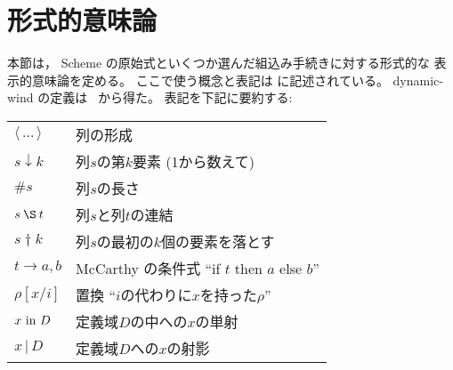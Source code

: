 \section{形式的意味論}
\label{formalsemanticssection}

\bgroup

\newcommand{\sembrack}[1]{[\![#1]\!]}
\newcommand{\fun}[1]{\hbox{\it #1}}
\newenvironment{semfun}{\begin{tabbing}$}{$\end{tabbing}}
\newcommand\LOC{{\tt{}L}}
\newcommand\NAT{{\tt{}N}}
\newcommand\TRU{{\tt{}T}}
\newcommand\SYM{{\tt{}Q}}
\newcommand\CHR{{\tt{}H}}
\newcommand\NUM{{\tt{}R}}
\newcommand\FUN{{\tt{}F}}
\newcommand\EXP{{\tt{}E}}
\newcommand\STV{{\tt{}E}}
\newcommand\STO{{\tt{}S}}
\newcommand\ENV{{\tt{}U}}
\newcommand\ANS{{\tt{}A}}
\newcommand\ERR{{\tt{}X}}
\newcommand\DP{\tt{P}}
\newcommand\EC{{\tt{}K}}
\newcommand\CC{{\tt{}C}}
\newcommand\MSC{{\tt{}M}}
\newcommand\PAI{\hbox{\EXP$_{\rm p}$}}
\newcommand\VEC{\hbox{\EXP$_{\rm v}$}}
\newcommand\STR{\hbox{\EXP$_{\rm s}$}}

\newcommand\elt{\downarrow}
\newcommand\drop{\dagger}

\newcommand{\wrong}[1]{\fun{wrong }\hbox{\rm``#1''}}
\newcommand{\go}[1]{\hbox{\hspace*{#1em}}}

本節は， Scheme の原始式といくつか選んだ組込み手続きに対する形式的な
表示的意味論を定める。
ここで使う概念と表記は \cite{Stoy77} に記述されている。
{\cf dynamic-wind} の定義は~\cite{GasbichlerKnauelSperberKelsey2003} から得た。
表記を下記に要約する:

\begin{tabular}{ll}
$\langle\,\ldots\,\rangle$ & 列の形成 \\
$s \elt k$	           & 列$s$の第$k$要素 (1から数えて) \\
$\#s$			   & 列$s$の長さ \\
$s \:\S\: t$	           & 列$s$と列$t$の連結 \\
$s \drop k$                & 列$s$の最初の$k$個の要素を落とす \\
$t \rightarrow a, b$       & McCarthy の条件式 ``if $t$ then $a$ else $b$'' \\
$\rho[x/i]$	           & 置換 ``$i$の代わりに$x$を持った$\rho$'' \\
$x\hbox{ \rm in }{\texttt{}D}$ & 定義域${\texttt{}D}$の中への$x$の単射 \\
$x\,\vert\,{\texttt{}D}$	   & 定義域${\texttt{}D}$への$x$の射影
\end{tabular}

